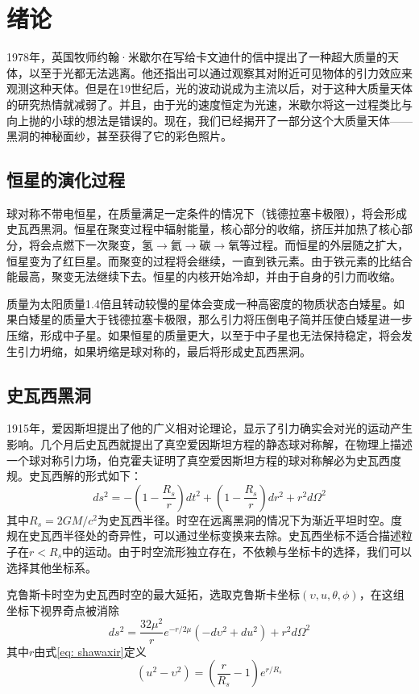 \chapter{绪论}

1978年，英国牧师约翰·米歇尔在写给卡文迪什的信中提出了一种超大质量的天体，以至于光都无法逃离\citep{michell1784vii}。他还指出可以通过观察其对附近可见物体的引力效应来观测这种天体。但是在19世纪后，光的波动说成为主流以后，对于这种大质量天体的研究热情就减弱了。并且，由于光的速度恒定为光速，米歇尔将这一过程类比与向上抛的小球的想法是错误的。现在，我们已经揭开了一部分这个大质量天体——黑洞的神秘面纱，甚至获得了它的彩色照片\citep{akiyama2021first}。

\section{恒星的演化过程}
球对称不带电恒星，在质量满足一定条件的情况下（钱德拉塞卡极限），将会形成史瓦西黑洞。恒星在聚变过程中辐射能量，核心部分的收缩，挤压并加热了核心部分，将会点燃下一次聚变，氢$\rightarrow$氦$\rightarrow$碳$\rightarrow$氧等过程。而恒星的外层随之扩大，恒星变为了红巨星。而聚变的过程将会继续，一直到铁元素。由于铁元素的比结合能最高，聚变无法继续下去。恒星的内核开始冷却，并由于自身的引力而收缩。

质量为太阳质量1.4倍且转动较慢的星体会变成一种高密度的物质状态白矮星。如果白矮星的质量大于钱德拉塞卡极限，那么引力将压倒电子简并压使白矮星进一步压缩，形成中子星。如果恒星的质量更大，以至于中子星也无法保持稳定，将会发生引力坍缩，如果坍缩是球对称的，最后将形成史瓦西黑洞。

\section{史瓦西黑洞}
1915年，爱因斯坦提出了他的广义相对论理论，显示了引力确实会对光的运动产生影响。几个月后史瓦西就提出了真空爱因斯坦方程的静态球对称解\citep{schwarzschild1916gravitationsfeld}，在物理上描述一个球对称引力场，伯克霍夫证明了真空爱因斯坦方程的球对称解必为史瓦西度规\citep{birkhoff1923relativity}。史瓦西解的形式如下：
\begin{equation}
    ds^2=-\left(1-\frac{R_s}{r}\right)dt^2+\left(1-\frac{R_s}{r}\right)dr^2+r^2d\Omega^2
\end{equation}
其中$R_s=2GM/c^2$为史瓦西半径。时空在远离黑洞的情况下为渐近平坦时空。度规在史瓦西半径处的奇异性，可以通过坐标变换来去除。史瓦西坐标不适合描述粒子在$r<R_s$中的运动。由于时空流形独立存在，不依赖与坐标卡的选择，我们可以选择其他坐标系。

克鲁斯卡时空为史瓦西时空的最大延拓，选取克鲁斯卡坐标$\left(\upsilon, u, \theta, \phi\right)$，在这组坐标下视界奇点被消除
\begin{equation}
    ds^2=\frac{32\mu^2}{r} e^{-r/2\mu}\left(-d\upsilon^2+du^2 \right)+r^2d\Omega^2
\end{equation}
其中$r$由式\eqref{eq: shawaxir}定义
\begin{equation}\label{eq: shawaxir}
    \left(u^2-\upsilon^2\right)=\left(\frac{r}{R_s}-1\right)e^{r/R_s}
\end{equation}

